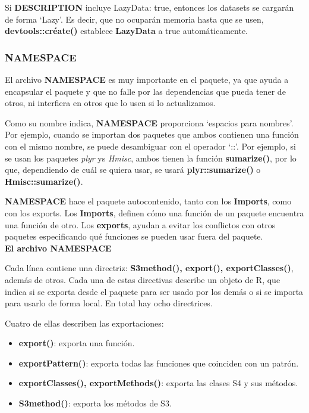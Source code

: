 Si \textbf{DESCRIPTION} incluye LazyData: true, entonces los datasets se cargar\'an de forma
\enquote*{Lazy}. Es decir, que no ocupar\'an memoria hasta que se usen, \textbf{devtools::cr\'eate()} establece
\textbf{LazyData} a true autom\'aticamente.

\subsubsection{NAMESPACE}

El archivo \textbf{NAMESPACE} es muy importante en el paquete, ya que  ayuda a encapsular el paquete y que no falle por las dependencias que pueda tener de otros, ni
interfiera en otros que lo usen si lo actualizamos.

Como su nombre indica, \textbf{NAMESPACE} proporciona \enquote*{espacios para nombres}. Por ejemplo,
cuando se importan dos paquetes que ambos contienen una funci\'on con el mismo nombre,
se puede desambiguar con el operador \enquote*{::}. Por ejemplo, si se usan los paquetes \textit{plyr} ys
\textit{Hmisc}, ambos tienen la funci\'on \textbf{sumarize()}, por lo que, dependiendo de cu\'al se quiera usar,
se usar\'a \textbf{plyr::sumarize()} o \textbf{Hmisc::sumarize()}.

\textbf{NAMESPACE} hace el paquete autocontenido, tanto con los \textbf{Imports}, como con los
exports. Los \textbf{Imports}, definen c\'omo una funci\'on de un paquete encuentra una funci\'on de
otro. Los \textbf{exports}, ayudan a evitar los conflictos con otros paquetes especificando qu\'e
funciones se pueden usar fuera del paquete.\\

\textbf{El archivo NAMESPACE}

Cada l\'inea contiene una directriz: \textbf{S3method(), export(), exportClasses()}, adem\'as de otros.
Cada una de estas directivas describe un objeto de R, que indica si se exporta desde
el paquete para ser usado por los dem\'as o si se importa para usarlo de forma local.
En total hay ocho directrices. 

Cuatro de ellas describen las exportaciones:

\begin{itemize}
    \item \textbf{ export()}: exporta una funci\'on.
    \item \textbf{ exportPattern()}: exporta todas las funciones que coinciden con un patr\'on.
    \item \textbf{ exportClasses(), exportMethods()}: exporta las clases S4 y sus m\'etodos.
    \item \textbf{ S3method()}: exporta los m\'etodos de S3.
\end{itemize}

